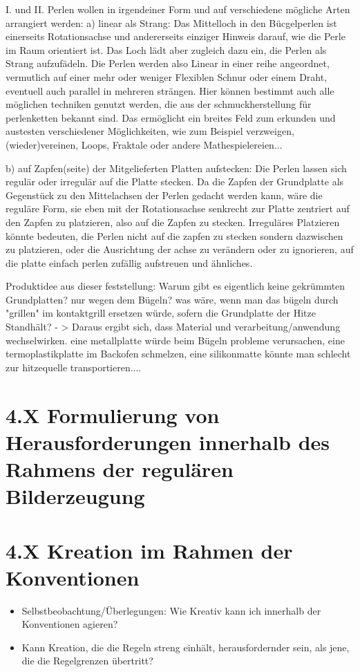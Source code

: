 \documentclass[11pt,a4paper,twoside]{scrreprt}
\begin{document}
I. und II. Perlen wollen in irgendeiner Form und auf verschiedene mögliche Arten arrangiert werden:
a) linear als Strang:
Das Mittelloch in den Bücgelperlen ist einerseits Rotationsachse und andererseits einziger Hinweis darauf, wie die Perle im Raum orientiert ist. Das Loch lädt aber zugleich dazu ein, die Perlen als Strang aufzufädeln. Die Perlen werden also Linear in einer reihe angeordnet, vermutlich auf einer mehr oder weniger Flexiblen Schnur oder einem Draht, eventuell auch parallel in mehreren strängen. Hier können bestimmt auch alle möglichen techniken genutzt werden, die aus der schmuckherstellung für perlenketten bekannt sind. Das ermöglicht ein breites Feld zum erkunden und austesten verschiedener Möglichkeiten, wie zum Beispiel verzweigen, (wieder)vereinen, Loops, Fraktale oder andere Mathespielereien...

b) auf Zapfen(seite) der Mitgelieferten Platten aufstecken:
Die Perlen lassen sich regulär oder irregulär auf die Platte stecken. Da die Zapfen der Grundplatte als Gegenstück zu den Mittelachsen der Perlen gedacht werden kann, wäre die reguläre Form, sie eben mit der Rotationsachse senkrecht zur Platte zentriert auf den Zapfen zu platzieren, also auf die Zapfen zu stecken. Irreguläres Platzieren könnte bedeuten, die Perlen nicht auf die zapfen zu stecken sondern dazwischen zu platzieren, oder die Ausrichtung der achse zu verändern oder zu ignorieren, auf die platte einfach perlen zufällig aufstreuen und ähnliches.

Produktidee aus dieser feststellung: Warum gibt es eigentlich keine gekrümmten Grundplatten? nur wegen dem Bügeln? was wäre, wenn man das bügeln durch "grillen" im kontaktgrill ersetzen würde, sofern die Grundplatte der Hitze Standhält? - > Daraus ergibt sich, dass Material und verarbeitung/anwendung wechselwirken. eine metallplatte würde beim Bügeln probleme verursachen, eine termoplastikplatte im Backofen schmelzen, eine silikonmatte könnte man schlecht zur hitzequelle transportieren....

	\section{4.X Formulierung von Herausforderungen innerhalb des Rahmens der regulären Bilderzeugung}

	\section{4.X Kreation im Rahmen der Konventionen}
	\begin{itemize}
		\item Selbstbeobachtung/Überlegungen: Wie Kreativ kann ich innerhalb der Konventionen agieren? 
		\item Kann Kreation, die die Regeln streng einhält, herausfordernder sein, als jene, die die Regelgrenzen übertritt?
	\end{itemize}
\end{document}
